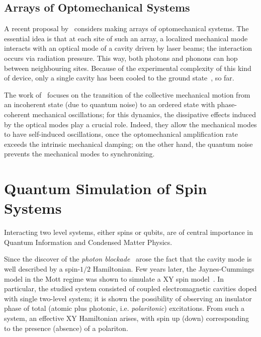 \subsection{Arrays of Optomechanical Systems}
A recent proposal by~\cite{optomechanical_arrays} considers making arrays of optomechanical systems. The essential idea is that at each site of such an array, a localized mechanical mode interacts with an optical mode of a cavity driven by laser beams; the interaction occurs via radiation pressure. This way, both photons and phonons can hop between neighbouring sites. Because of the experimental complexity of this kind of device, only a single cavity has been cooled to the ground state~\cite{Lee_Haffner_Cross}, so far. 

The work of~\cite{optomechanical_arrays} focuses on the transition of the collective mechanical motion from an incoherent state (due to quantum noise) to an ordered state with phase-coherent mechanical oscillations; for this dynamics, the dissipative effects induced by the optical modes play a crucial role. Indeed, they allow the mechanical modes to have self-induced oscillations, once the optomechanical amplification rate exceeds the intrinsic mechanical damping; on the other hand, the quantum noise prevents the mechanical modes to synchronizing.


\section{Quantum Simulation of Spin Systems}
Interacting two level systems, either spins or qubits, are of central importance in Quantum Information and Condensed Matter Physics. 

Since the discover of the \emph{photon blockade}~\cite{ph_blockade} arose the fact that the cavity mode is well described by a spin-$1/2$ Hamiltonian. Few years later, the Jaynes-Cummings model in the Mott regime was shown to simulate a XY spin model~\cite{angelakis}. In particular, the studied system consisted of coupled electromagnetic cavities doped with single two-level system; it is shown the possibility of observing an insulator phase of total (atomic plus photonic, i.e. \emph{polaritonic}) excitations. From such a system, an effective XY Hamiltonian arises, with spin up (down) corresponding to the presence (absence) of a polariton.

